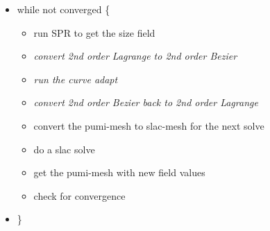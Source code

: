 \documentclass[review,authoryear,12pt]{elsarticle_summary_report}
\begin{document}
\begin{itemize}
  \item[] while not converged \{
   \begin{itemize}
	  \item run SPR to get the size field 
	  \item \textit{convert 2nd order Lagrange to 2nd order Bezier}
	  \item \textit{run the curve adapt}
	  \item \textit{convert 2nd order Bezier back to 2nd order Lagrange}
	  \item convert the pumi-mesh to slac-mesh for the next solve
	  \item do a slac solve
	  \item get the pumi-mesh with new field values
	  \item check for convergence
	\end{itemize}
  \item[] \}
\end{itemize}
\end{document}
